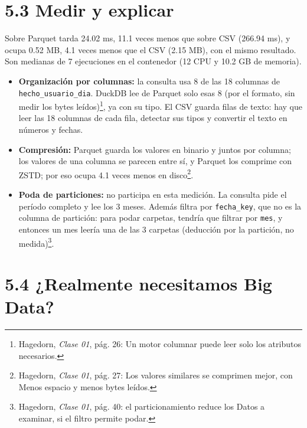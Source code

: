 \documentclass[11pt]{article}
\begin{document}
\section{5.3 Medir y explicar}

Sobre Parquet tarda 24.02 ms, 11.1 veces menos que sobre CSV (266.94 ms), y
ocupa 0.52 MB, 4.1 veces menos que el CSV (2.15 MB), con el mismo resultado.
Son medianas de 7 ejecuciones en el contenedor (12 CPU y 10.2 GB de memoria).
\begin{itemize}
  \item \textbf{Organización por columnas:} la consulta usa 8 de las 18
  columnas de \texttt{hecho\_usuario\_dia}. DuckDB lee de Parquet solo esas
  8 (por el formato, sin medir los bytes leídos)\footnote{Hagedorn, \emph{Clase 01}, pág. 26: \textquotedbl{}Un motor
  columnar puede leer solo los atributos necesarios\textquotedbl{}.}, ya con
  su tipo. El CSV guarda filas de texto: hay que leer las 18 columnas de cada
  fila, detectar sus tipos y convertir el texto en números y fechas.
  \item \textbf{Compresión:} Parquet guarda los valores en binario y juntos
  por columna; los valores de una columna se parecen entre sí, y Parquet los comprime con ZSTD; por eso ocupa
  4.1 veces menos en disco\footnote{Hagedorn, \emph{Clase 01},
  pág. 27: \textquotedbl{}Los valores similares se comprimen
  mejor\textquotedbl{}, con \textquotedbl{}Menos espacio y menos bytes
  leídos\textquotedbl{}.}.
  \item \textbf{Poda de particiones:} no participa en esta medición. La
  consulta pide el período completo y lee los 3 meses. Además filtra por
  \texttt{fecha\_key}, que no es la columna de partición: para podar carpetas,
  tendría que filtrar por \texttt{mes}, y entonces un mes leería una de las 3 carpetas
  (deducción por la partición, no medida)\footnote{Hagedorn, \emph{Clase 01}, pág. 40:
  el particionamiento reduce los \textquotedbl{}Datos a examinar, si el filtro
  permite podar\textquotedbl{}.}.
\end{itemize}

\section{5.4 ¿Realmente necesitamos Big Data?}
\end{document}

